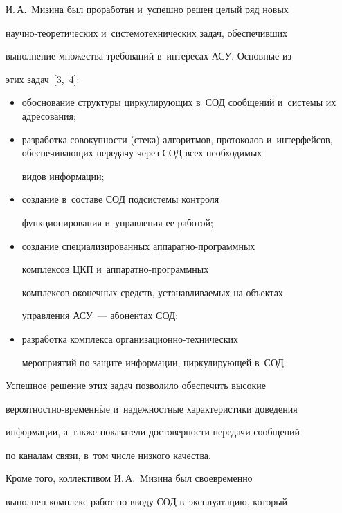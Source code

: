 И.\,А.~Мизина был проработан и~успешно решен целый ряд новых


научно-теоретических и~системотехнических задач, обеспечивших


выполнение множества требований в~интересах АСУ. Основные из


этих задач~[3,~4]:


    \begin{itemize}


\item обоснование структуры циркулирующих в~СОД сообщений и~системы их адресования;


    \item разработка совокупности (стека) алгоритмов, протоколов и~интерфейсов, обеспечивающих передачу через СОД всех необходимых


видов информации;


    \item создание в~составе СОД подсистемы контроля


функционирования и~управ\-ле\-ния ее работой;


    \item создание специализированных аппаратно-программных


комплексов ЦКП и~ап\-па\-рат\-но-программных


комплексов оконечных средств, устанавливаемых на объектах


управления АСУ~--- абонентах СОД;


    \item  разработка комплекса организационно-технических


мероприятий по защите информации, циркулирующей в~СОД.


    \end{itemize}





    Успешное решение этих задач позволило обеспечить высокие


вероятностно-вре\-мен\-н$\acute{\mbox{ы}}$е и~надежностные характеристики доведения


информации, а~также показатели достоверности передачи сообщений


по каналам связи, в~том числе низкого качества.





    Кроме того, коллективом И.\,А.~Мизина был своевременно


выполнен комплекс работ по вводу СОД в~эксплуатацию, который


